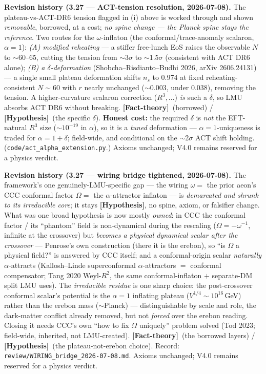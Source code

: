 \documentclass[11pt]{article}
\newcommand{\factth}{\textcolor{green!40!black}{\textbf{[Fact-theory]}}}
\newcommand{\hyp}{\textcolor{orange!80!black}{\textbf{[Hypothesis]}}}
\begin{document}
{\smallskip\noindent\textbf{Revision history (3.27 --- ACT-tension resolution, 2026-07-08).} The plateau-vs-ACT-DR6 tension flagged in (i) above is worked through and shown \emph{removable}, borrowed, at a cost; \emph{no spine change --- the Planck spine stays the reference}. Two routes for the $\omega$-inflaton (the conformal/trace-anomaly scalaron, $\alpha{=}1$): \emph{(A) modified reheating} --- a stiffer free-lunch EoS raises the observable $N$ to $\sim$60--65, cutting the tension from $\sim$3$\sigma$ to $\sim$1.5$\sigma$ (consistent with ACT DR6 alone); \emph{(B) a $\delta$-deformation} (Shobcha--Risdianto--Budhi 2026, arXiv 2606.24131) --- a single small plateau deformation shifts $n_s$ to 0.974 at fixed reheating-consistent $N\!\sim\!60$ with $r$ nearly unchanged ($\sim$0.003, under 0.038), removing the tension. A higher-curvature scalaron correction ($R^3,\dots$) \emph{is} such a $\delta$, so LMU absorbs ACT DR6 without breaking. \factth\ (borrowed) / \hyp\ (the specific $\delta$). \textbf{Honest cost:} the required $\delta$ is \emph{not} the EFT-natural $R^3$ size ($\sim$$10^{-19}$ in $\alpha$), so it is a \emph{tuned} deformation --- $\alpha{=}1$-uniqueness is traded for $\alpha{=}1+\delta$; field-wide, and conditional on the $\sim$2$\sigma$ ACT shift holding. (\texttt{code/act\_alpha\_extension.py}.) Axioms unchanged; V4.0 remains reserved for a physics verdict.

\smallskip\noindent\textbf{Revision history (3.27 --- wiring bridge tightened, 2026-07-08).} The framework's one genuinely-LMU-specific gap --- the wiring $\omega=$ the prior aeon's CCC conformal factor $\Omega=$ the $\alpha$-attractor inflaton --- is \emph{demarcated and shrunk to its irreducible core}; it stays \hyp, no spine, axiom, or falsifier change. What was one broad hypothesis is now mostly \emph{owned}: in CCC the conformal factor / its ``phantom'' field is non-dynamical during the rescaling ($\Omega=-\omega^{-1}$, infinite at the crossover) but \emph{becomes a physical dynamical scalar after the crossover} --- Penrose's own construction (there it is the erebon), so ``is $\Omega$ a physical field?'' is answered by CCC itself; and a conformal-origin scalar \emph{naturally} $\alpha$-attracts (Kallosh--Linde superconformal $\alpha$-attractors $=$ conformal compensator; Tang 2020 Weyl-$R^2$, the same conformal-inflaton $+$ separate-DM split LMU uses). The \emph{irreducible residue} is one sharp choice: the post-crossover conformal scalar's potential is the $\alpha{=}1$ inflating plateau ($V^{1/4}\!\sim\!10^{16}$\,GeV) rather than the erebon mass ($\sim$Planck) --- distinguishable by scale and role, the dark-matter conflict already removed, but not \emph{forced} over the erebon reading. Closing it needs CCC's own ``how to fix $\Omega$ uniquely'' problem solved (Tod 2023; field-wide, inherited, not LMU-created). \factth\ (the borrowed layers) / \hyp\ (the plateau-not-erebon choice). Record: \texttt{review/WIRING\_bridge\_2026-07-08.md}. Axioms unchanged; V4.0 remains reserved for a physics verdict.

}
\end{document}
